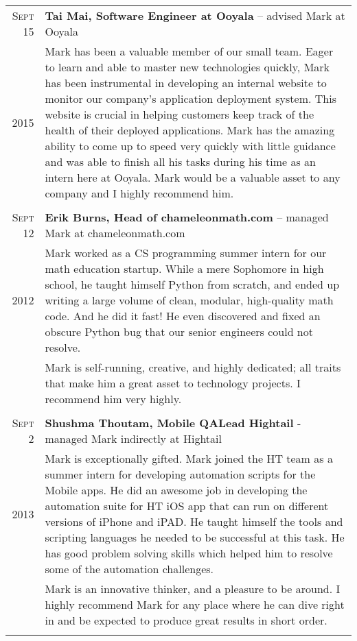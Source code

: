 \documentclass[a4paper,10pt]{article}
\begin{document}
\begin{tabular}{r|p{15cm}}	
 \textsc{Sept 15} & \textbf{Tai Mai, Software Engineer at Ooyala} – advised Mark at Ooyala\\ 
 \textsc{2015} & Mark has been a valuable member of our small team. Eager to learn and able to master new technologies quickly, Mark has been instrumental in developing an internal website to monitor our company’s application deployment system. This website is crucial in helping customers keep track of the health of their deployed applications. Mark has the amazing ability to come up to speed very quickly with little guidance and was able to finish all his tasks during his time as an intern here at Ooyala. Mark would be a valuable asset to any company and I highly recommend him. \\
 \multicolumn{2}{c}{} \\
 
 \textsc{Sept 12} & \textbf{Erik Burns, Head of chameleonmath.com} – managed Mark at chameleonmath.com\\ 
 \textsc{2012} & Mark worked as a CS programming summer intern for our math education startup. While a mere Sophomore in high school, he taught himself Python from scratch, and ended up writing a large volume of clean, modular, high-quality math code. And he did it fast! He even discovered and fixed an obscure Python bug that our senior engineers could not resolve. \\
 & Mark is self-running, creative, and highly dedicated; all traits that make him a great asset to technology projects. I recommend him very highly. \\
 \multicolumn{2}{c}{} \\
 
 \textsc{Sept 2} & \textbf{Shushma Thoutam, Mobile QALead Hightail} - managed Mark indirectly at Hightail\\ 
 \textsc{2013} & Mark is exceptionally gifted. Mark joined the HT team as a summer intern for developing automation scripts for the Mobile apps. He did an awesome job in developing the automation suite for HT iOS app that can run on different versions of iPhone and iPAD. He taught himself the tools and scripting languages he needed to be successful at this task. He has good problem solving skills which helped him to resolve some of the automation challenges. \\
 & Mark is an innovative thinker, and a pleasure to be around. I highly recommend Mark for any place where he can dive right in and be expected to produce great results in short order. \\
 \multicolumn{2}{c}{} \\


\end{tabular}
\end{document}
